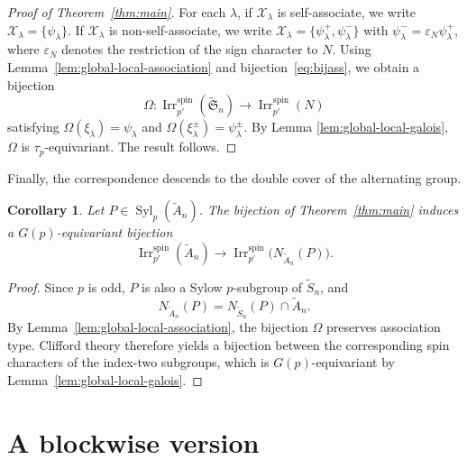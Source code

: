 \documentclass[reqno]{amsart}
\DeclareMathOperator{\Irr}{Irr}
\DeclareMathOperator{\Syl}{Syl}
\newcommand{\sym}{\mathfrak{S}}
\newtheorem{corollary}[theorem]{Corollary}
\theoremstyle{definition}
\begin{document}
\begin{proof}[Proof of Theorem~\ref{thm:main}]
For each $\lambda$, if $\mathcal X_\lambda$ is self-associate, we write $
\mathcal X_\lambda=\{\psi_\lambda\}$. If $\mathcal X_\lambda$ is
non-self-associate, we write $ \mathcal
X_\lambda=\{\psi_\lambda^+,\psi_\lambda^-\}$ with
$\psi_\lambda^-=\varepsilon_N\psi_\lambda^+$, where $\varepsilon_N$
denotes the restriction of the sign character to $N$. 
Using Lemma~\ref{lem:global-local-association} and
bijection~\eqref{eq:bijass}, we obtain a bijection
\[
\Omega:
\Irr_{p'}^{\mathrm{spin}}(\widetilde{\sym}_n)
\longrightarrow
\Irr_{p'}^{\mathrm{spin}}(N)
\]
satisfying $\Omega(\xi_\lambda)=\psi_\lambda$ and
$\Omega(\xi_\lambda^\pm)=\psi_\lambda^{\pm}$.
By Lemma \ref{lem:global-local-galois}, $\Omega$ is $\tau_p$-equivariant.
The result follows.
\end{proof}

Finally, the correspondence descends to the double cover of the
alternating group.
\begin{corollary}
Let $P\in\Syl_p(\widetilde A_n)$. The bijection of
Theorem~\ref{thm:main} induces a $G(p)$-equivariant bijection
\[
\Irr_{p'}^{\mathrm{spin}}(\widetilde A_n)
\longrightarrow
\Irr_{p'}^{\mathrm{spin}}
\bigl(N_{\widetilde A_n}(P)\bigr).
\]
\end{corollary}

\begin{proof}
Since $p$ is odd, $P$ is also a Sylow $p$-subgroup of
$\widetilde S_n$, and
\[
N_{\widetilde A_n}(P)
=
N_{\widetilde S_n}(P)\cap\widetilde A_n.
\]
By Lemma~\ref{lem:global-local-association}, the bijection $\Omega$
preserves association type. Clifford theory therefore yields a bijection
between the corresponding spin characters of the index-two subgroups,
which is $G(p)$-equivariant by
Lemma~\ref{lem:global-local-galois}.    
\end{proof}

\section{A blockwise version}
\label{sec:blockwise}
\end{document}
